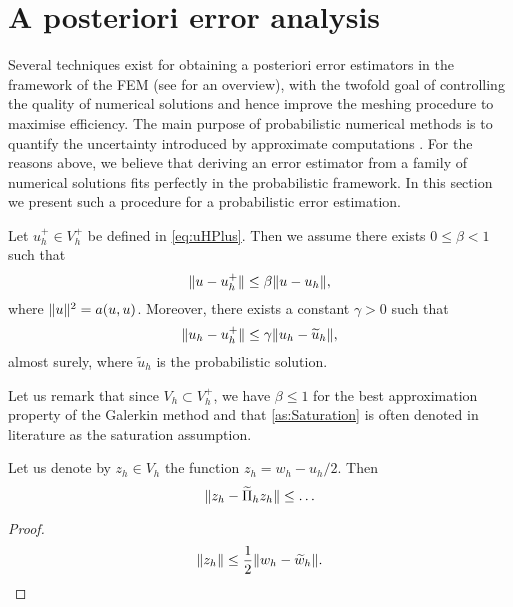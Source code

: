 \section{A posteriori error analysis}\label{sec:errorestimation}
 
Several techniques exist for obtaining a posteriori error estimators in the framework of the FEM (see \cite{Ver13} for an overview), with the twofold goal of controlling the quality of numerical solutions and hence improve the meshing procedure to maximise efficiency. The main purpose of probabilistic numerical methods is to quantify the uncertainty introduced by approximate computations \cite{HOG15}. For the reasons above, we believe that deriving an error estimator from a family of numerical solutions fits perfectly in the probabilistic framework. In this section we present such a procedure for a probabilistic error estimation.
\begin{assumption}\label{as:Saturation} Let $u_h^+ \in V_h^+$ be defined in \eqref{eq:uHPlus}. Then we assume there exists $0 \leq \beta < 1$ such that
	\begin{equation}
		\lVert u - u_h^+\rVert \leq \beta \lVert u - u_h\rVert,
	\end{equation} 
	where $\lVert u\rVert^2 = a(u, u)$. Moreover, there exists a constant $\gamma > 0$ such that
	\begin{equation}\label{eq:Saturation2}
		\lVert u_h - u_h^+\rVert \leq \gamma \lVert u_h - \widetilde u_h\rVert,
	\end{equation}
	almost surely, where $\widetilde u_h$ is the probabilistic solution.
\end{assumption}


Let us remark that since $V_h \subset V_h^+$, we have $\beta \leq 1$ for the best approximation property of the Galerkin method and that \cref{as:Saturation} is often denoted in literature as the saturation assumption.


\begin{lemma} Let us denote by $z_h \in V_h$ the function $z_h = w_h - u_h /2$. Then
	\begin{equation}
		\lVert z_h - \widetilde \Pi_h z_h\rVert \leq \ldots
	\end{equation}
\end{lemma}

\begin{proof} 
	\begin{equation}
		\lVert z_h\rVert \leq \frac12 \lVert w_h - \widetilde w_h\rVert.
	\end{equation}
\end{proof}

